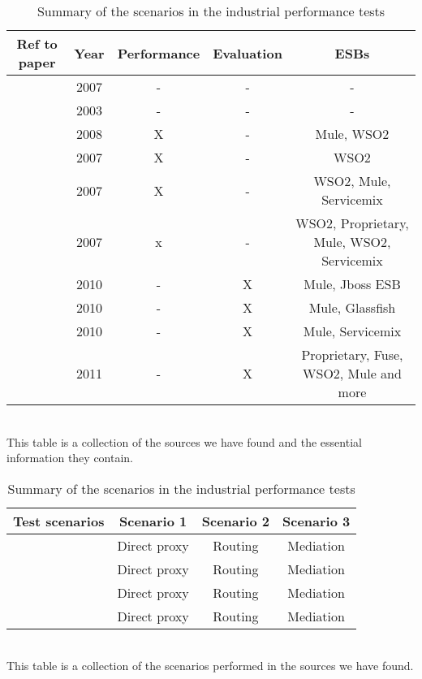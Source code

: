 \begin{table}
	\caption{Summary of industrial papers and what tests they perform}
	\begin{tabular}{| c | c | c | c | c |}
		\hline
		Ref to paper & Year & Performance & Evaluation & ESBs \\ 
		\hline	
		\cite{falko07} & 2007 & - & - & - \\ 
		\hline	
		\cite{fenner03} & 2003 & - & - & - \\
		\hline	
		\cite{mulesoft08} & 2008 & X & - & Mule, WSO2\\
		\hline	
		\cite{Perera07} & 2007 & X & - & WSO2 \\
		\hline	
		\cite{Perera07R2} & 2007 & X & - & WSO2, Mule, Servicemix\\
		\hline	
		\cite{Perera07R3} & 2007 & x & - & WSO2, Proprietary, Mule, WSO2, Servicemix \\
		\hline	
		\cite{mulevsjboss} & 2010 & - & X & Mule, Jboss ESB\\
		\hline	
		\cite{mulevsglassfish} & 2010 & - & X & Mule, Glassfish \\
		\hline	
		\cite{mulevsservicemix} & 2010 & - & X & Mule, Servicemix \\
		\hline
		\cite{forrester11} & 2011 & - & X & Proprietary, Fuse, WSO2, Mule and more\\
		\hline
	\end{tabular}
	\\
	This table is a collection of the sources we have found and the essential information they contain.

	\caption{Summary of the scenarios in the industrial performance tests}
	\begin{tabular}{| c | c | c | c |}
		\hline
		Test scenarios & Scenario 1 & Scenario 2 & Scenario 3 \\
		\hline
		\cite{mulesoft08} & Direct proxy & Routing & Mediation \\
		\hline
		\cite{Perera07} & Direct proxy & Routing & Mediation \\
		\hline
		\cite{Perera07R2} & Direct proxy & Routing & Mediation \\
		\hline
		\cite{Perera07R3} & Direct proxy & Routing & Mediation \\
		\hline
	\end{tabular}
	\\
	This table is a collection of the scenarios performed in the sources we have found. 
\end{table}


